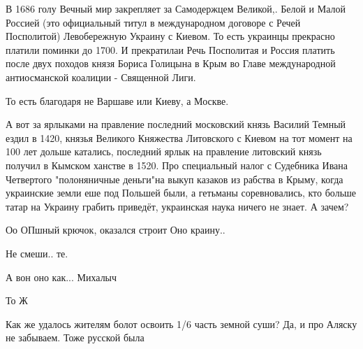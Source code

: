 \begin{itemize}
В 1686 голу Вечный мир закрепляет за Самодержцем Великой,. Белой и Малой
Россией (это официальный титул в международном договоре с Речей Посполитой)
Левобережную Украину с Киевом. То есть украинцы прекрасно платили поминки до
1700. И прекратилаи Речь Посполитая и Россия платить после двух походов князя
Бориса Голицына в Крым во Главе международной антиосманской коалиции -
Священной Лиги.

То есть благодаря не Варшаве или Киеву, а Москве.

А вот за ярлыками на правление последний московский князь Василий Темный ездил
в 1420, князья Великого Княжества Литовского с Киевом на тот момент на 100 лет
дольше катались, последний ярлык на правление литовский князь получил в Кымском
ханстве в 1520.  Про специальный налог с Судебника Ивана Четвертого
"полоняничные деньги"на выкуп казаков из рабства в Крыму, когда украинские
земли еше под Польшей были, а гетьманы соревновались, кто больше татар на
Украину грабить приведёт, украинская наука ничего не знает. А зачем?

 
Оо ОПшный крючок, оказался строит Оно краину..

Не смеши.. те.

А вон оно как... Михалыч

 
То Ж

 
Как же удалось жителям болот освоить 1/6 часть земной суши? Да, и про Аляску не забываем. Тоже русской была

 

\end{itemize}

